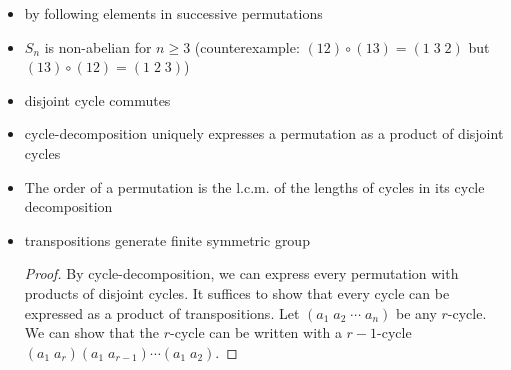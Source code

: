 \documentclass[11pt]{article}
\begin{document}
\begin{definition*}
\begin{itemize}
        \item {} by following elements in successive permutations
        \item {} $S_n$ is non-abelian for $n\geq 3$ (counterexample: $(12) \circ(13) = (1\;3\;2)$ but $(13)\circ(12) = (1\;2\;3)$)
        \item {} disjoint cycle commutes
        \item {} cycle-decomposition uniquely expresses a permutation as a product of disjoint cycles
        \item {} The order of a permutation is the l.c.m. of the lengths of cycles in its cycle decomposition
        \item {} transpositions generate finite symmetric group
        \begin{proof}
            By cycle-decomposition, we can express every permutation with products of disjoint cycles. It suffices to show that every cycle can be expressed as a product of transpositions. Let $(a_1\;a_2\;\cdots\;a_n)$ be any $r$-cycle. We can show that the $r$-cycle can be written with a $r-1$-cycle $(a_1\;a_r)(a_1\;a_{r-1}) \cdots (a_1\;a_2)$.
        \end{proof}
    \end{itemize}
\end{definition*}


\section{}
\end{document}
